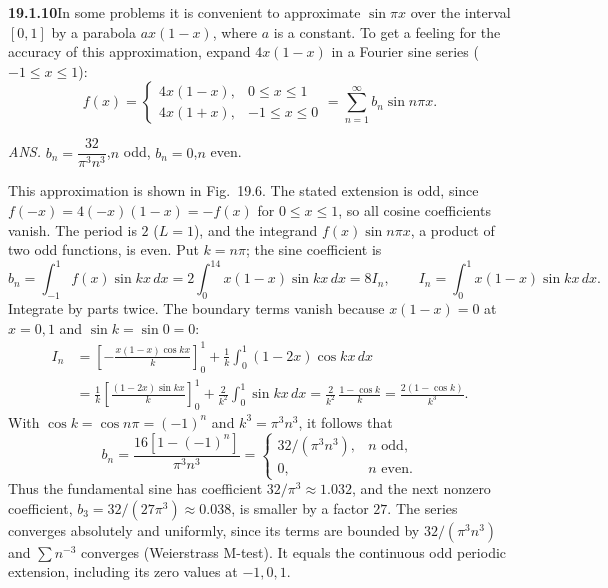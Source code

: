 \par\bigskip
\noindent\textbf{19.1.10}\quad In some problems it is convenient to
approximate $\sin\pi x$ over the interval $[0,1]$ by a parabola
$ax(1-x)$, where $a$ is a constant. To get a feeling for the
accuracy of this approximation, expand $4x(1-x)$ in a Fourier sine
series ($-1\le x\le1$):
\[
f(x)=\begin{cases}
4x(1-x), & 0\le x\le1\\
4x(1+x), & -1\le x\le0
\end{cases}
=\sum_{n=1}^{\infty}b_{n}\sin n\pi x.
\]
\par\nobreak\hfill\emph{ANS.}\enspace
$b_{n}=\dfrac{32}{\pi^{3}n^{3}}$,\quad $n$ odd,\qquad
$b_{n}=0$,\quad $n$ even.
\par This approximation is shown in Fig.~19.6.
\solution
The stated extension is odd, since $f(-x)=4(-x)(1-x)=-f(x)$ for
$0\le x\le1$, so all cosine coefficients vanish. The period is $2$
($L=1$), and the integrand $f(x)\sin n\pi x$, a product of two odd
functions, is even. Put $k=n\pi$; the sine coefficient is
\[
b_n=\int_{-1}^1f(x)\sin kx\,dx=2\int_0^14x(1-x)\sin kx\,dx=8I_n,
\qquad I_n=\int_0^1x(1-x)\sin kx\,dx.
\]
Integrate by parts twice. The boundary terms vanish because
$x(1-x)=0$ at $x=0,1$ and $\sin k=\sin0=0$:
\begin{align*}
I_n&=\left[-\frac{x(1-x)\cos kx}{k}\right]_0^1
 +\frac1k\int_0^1(1-2x)\cos kx\,dx\\
&=\frac1k\left[\frac{(1-2x)\sin kx}{k}\right]_0^1
 +\frac2{k^2}\int_0^1\sin kx\,dx
 =\frac2{k^2}\,\frac{1-\cos k}{k}
 =\frac{2(1-\cos k)}{k^3}.
\end{align*}
With $\cos k=\cos n\pi=(-1)^n$ and $k^3=\pi^3n^3$, it follows that
\[
\boxed{b_n=\frac{16[1-(-1)^n]}{\pi^3n^3}
=\begin{cases}32/(\pi^3n^3),&n\text{ odd},\\0,&n\text{ even}.
\end{cases}}
\]
Thus the fundamental sine has coefficient $32/\pi^3\approx1.032$, and
the next nonzero coefficient, $b_3=32/(27\pi^3)\approx0.038$, is smaller
by a factor $27$. The series converges
absolutely and uniformly, since its terms are bounded by
$32/(\pi^3n^3)$ and $\sum n^{-3}$ converges (Weierstrass M-test). It
equals the continuous odd periodic
extension, including its zero values at $-1,0,1$.

